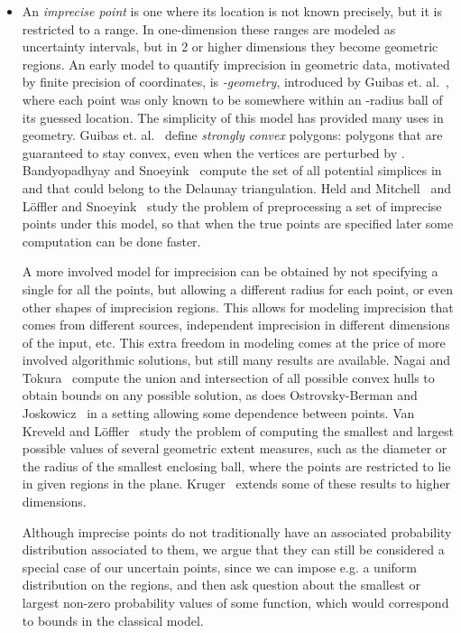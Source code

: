 \documentclass{journal}
\newcommand{\etal}{et. al.}
\begin{document}
\begin{itemize}
\item 
An \emph{imprecise point} is one where its location is not known precisely, but it is restricted to a range.  In one-dimension these ranges are modeled as uncertainty intervals, but in 2 or higher dimensions they become geometric regions. 
An early model to quantify imprecision in geometric data, motivated by finite precision of coordinates, is {\it -geometry}, introduced by Guibas \etal~\cite {gss-egbra-89}, where each point was only known to be somewhere within an -radius ball of its guessed location. 
The simplicity of this model has provided many uses in geometry.
Guibas \etal~\cite {gss-cscah-93} define \emph {strongly convex} polygons: polygons that are guaranteed to stay convex, even when the vertices are perturbed by . 
Bandyopadhyay and Snoeyink~\cite{bs-ads-04} compute the set of all potential simplices in  and  that could belong to the Delaunay triangulation.
Held and Mitchell~\cite {hm-ticpps-08} and L\"offler and Snoeyink~\cite {ls-dtip-08} study the problem of preprocessing a set of imprecise points under this model, so that when the true points are specified later some computation can be done faster.

A more involved model for imprecision can be obtained by not specifying a single  for all the points, but allowing a different radius for each point, or even other shapes of imprecision regions. This allows for modeling imprecision that comes from different sources, independent imprecision in different dimensions of the input, etc. This extra freedom in modeling comes at the price of more involved algorithmic solutions, but still many results are available.
Nagai and Tokura~\cite {nt-teb-00} compute the union and intersection of all possible convex hulls to obtain bounds on any possible solution, as does Ostrovsky-Berman and Joskowicz~\cite {obj-ue-05} in a setting allowing some dependence between points.
Van Kreveld and L\"offler~\cite {kl-bgmips-06} study the problem of computing the smallest and largest possible values of several geometric extent measures, such as the diameter or the radius of the smallest enclosing ball, where the points are restricted to lie in given regions in the plane.
Kruger~\cite {k-bmips-08} extends some of these results to higher dimensions.

Although imprecise points do not traditionally have an associated probability distribution associated to them, we argue that they can still be considered a special case of our uncertain points, since we can impose e.g. a uniform distribution on the regions, and then ask question about the smallest or largest non-zero probability values of some function, which would correspond to bounds in the classical model.




\end{itemize}
\end{document}
